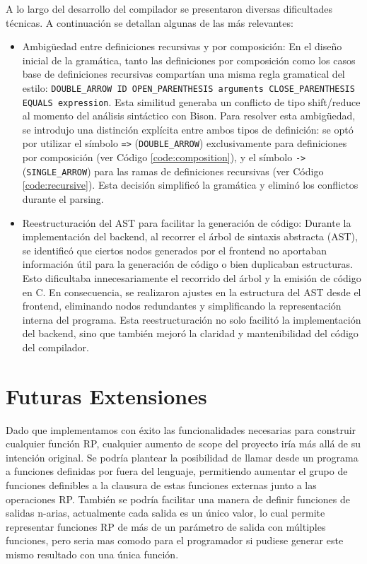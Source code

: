 \documentclass{article}
\begin{document}
A lo largo del desarrollo del compilador se presentaron diversas dificultades técnicas. A continuación se detallan algunas de las más relevantes:

\begin{itemize}
\item Ambigüedad entre definiciones recursivas y por composición: En el diseño inicial de la gramática, tanto las definiciones por composición como los casos base de definiciones recursivas compartían una misma regla gramatical del estilo: \texttt{DOUBLE\_ARROW ID OPEN\_PARENTHESIS arguments CLOSE\_PARENTHESIS EQUALS expression}. Esta similitud generaba un conflicto de tipo shift/reduce al momento del análisis sintáctico con Bison. Para resolver esta ambigüedad, se introdujo una distinción explícita entre ambos tipos de definición: se optó por utilizar el símbolo \texttt{=>} (\texttt{DOUBLE\_ARROW}) exclusivamente para definiciones por composición (ver Código \ref{code:composition}), y el símbolo \texttt{->}  (\texttt{SINGLE\_ARROW}) para las ramas de definiciones recursivas (ver Código \ref{code:recursive}). Esta decisión simplificó la gramática y eliminó los conflictos durante el parsing.
\item Reestructuración del AST para facilitar la generación de código: Durante la implementación del backend, al recorrer el árbol de sintaxis abstracta (AST), se identificó que ciertos nodos generados por el frontend no aportaban información útil para la generación de código o bien duplicaban estructuras. Esto dificultaba innecesariamente el recorrido del árbol y la emisión de código en C. En consecuencia, se realizaron ajustes en la estructura del AST desde el frontend, eliminando nodos redundantes y simplificando la representación interna del programa. Esta reestructuración no solo facilitó la implementación del backend, sino que también mejoró la claridad y mantenibilidad del código del compilador.
\end{itemize}

\section {Futuras Extensiones}

Dado que implementamos con éxito las funcionalidades necesarias para construir cualquier función RP, cualquier aumento de scope del proyecto iría más allá de su intención original. Se podría plantear la posibilidad de llamar desde un programa a funciones definidas por fuera del lenguaje, permitiendo aumentar el grupo de funciones definibles a la clausura de estas funciones externas junto a las operaciones RP. También se podría facilitar una manera de definir funciones de salidas n-arias, actualmente cada salida es un único valor, lo cual permite representar funciones RP de más de un parámetro de salida con múltiples funciones, pero seria mas comodo para el programador si pudiese generar este mismo resultado con una única función.
\end{document}
